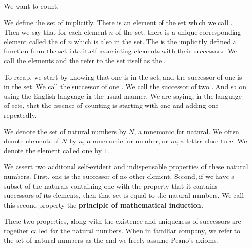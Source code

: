 
\sbasic




\sstart



We want to count.



We define the set of  implicitly.
There is an element of the set which we call .
Then we say that for each element $n$ of the set, there is a unique corresponding element called the  of $n$ which is also in the set.
The  is the implicitly defined a function from the set into itself associating elements with their successors.
We call the elements  and the refer to the set itself as the .

To recap, we start by knowing that one is in the set, and the successor of one is in the set.
We call the successor of one .
We call the successor of two .
And so on using the English language in the usual manner.
We are saying, in the language of sets, that the essence of counting is starting with one and adding one repeatedly.


We denote the set of natural numbers by $N$, a mnemonic for natural.
We often denote elements of $N$ by $n$, a mnemonic for number, or $m$, a letter close to $n$.
We denote the element called one by $1$.


We assert two additonal self-evident and indispensable properties of these natural numbers.
First, one is the successor of no other element.
Second, if we have a subset of the naturals containing one with the property that it contains successors of its elements, then that set is equal to the natural numbers.
We call this second property the \textbf{principle of mathematical induction.}

These two properties, along with the existence and uniqueness of successors are together called  for the natural numbers.
When in familiar company, we refer to the set of natural numbers as the  and we freely assume Peano's axioms.

